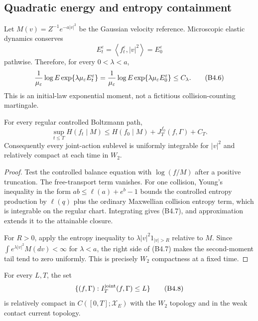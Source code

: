 \subsection{Quadratic energy and entropy containment}

Let $M(v)=Z^{-1}e^{-a|v|^2}$ be the Gaussian velocity reference.  Microscopic
elastic dynamics conserves
\[
 E^\varepsilon_t=\left\langle f_t^\varepsilon,|v|^2\right\rangle
 =E^\varepsilon_0                                             \tag{B4.5}
\]
pathwise.  Therefore, for every $0<\lambda<a$,
\[
 {1\over\mu_\varepsilon}\log
 E\exp\{\lambda\mu_\varepsilon E_t^\varepsilon\}
 ={1\over\mu_\varepsilon}\log
 E\exp\{\lambda\mu_\varepsilon E_0^\varepsilon\}\le C_\lambda.       \tag{B4.6}
\]
This is an initial-law exponential moment, not a fictitious collision-counting
martingale.

\begin{lemma}
\label{lem:r29-b4-entropy}
For every regular controlled Boltzmann path,
\[
 \sup_{t\le T}H(f_t\mid M)
 \le H(f_0\mid M)+J_T^{f_0}(f,\Gamma)+C_T.                 \tag{B4.7}
\]
Consequently every joint-action sublevel is uniformly integrable for
$|v|^2$ and relatively compact at each time in $W_2$.
\end{lemma}

\begin{proof}
Test the controlled balance equation with
$\log(f/M)$ after a positive truncation.  The free-transport term vanishes.
For one collision, Young's inequality in the form
$ab\le\ell(a)+e^b-1$ bounds the controlled entropy production by
$\ell(q)$ plus the ordinary Maxwellian collision entropy term, which is
integrable on the regular chart.  Integrating gives (B4.7), and approximation
extends it to the attainable closure.

For $R>0$, apply the entropy inequality to
$\lambda|v|^2 1_{|v|>R}$ relative to $M$.  Since
$\int e^{\lambda|v|^2}M(dv)<\infty$ for $\lambda<a$, the right side of
(B4.7) makes the second-moment tail tend to zero uniformly.  This is precisely
$W_2$ compactness at a fixed time.
\end{proof}

\begin{theorem}
\label{thm:r29-b4-compact}
For every $L,T$, the set
\[
 \{(f,\Gamma):I_T^{\rm joint}(f,\Gamma)\le L\}            \tag{B4.8}
\]
is relatively compact in
$C([0,T];\mathcal X_E)$ with the $W_2$ topology and in the weak contact
current topology.
\end{theorem}

